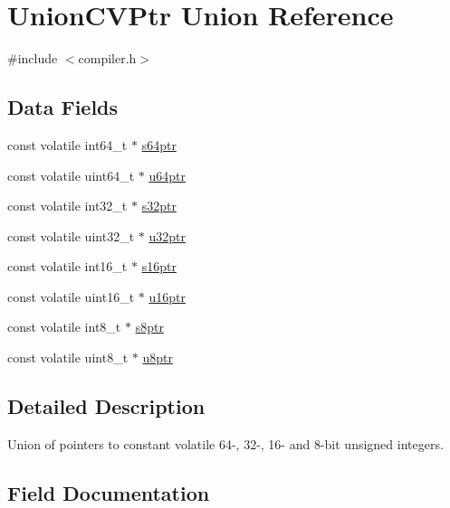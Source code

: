 \hypertarget{union_union_c_v_ptr}{}\section{Union\+C\+V\+Ptr Union Reference}
\label{union_union_c_v_ptr}


{\ttfamily \#include $<$compiler.\+h$>$}

\subsection*{Data Fields}
\begin{DoxyCompactItemize}
\item 
const volatile int64\+\_\+t $\ast$ \mbox{\hyperlink{union_union_c_v_ptr_aa79f3b96a6ad079e73cc0be13bd0e765}{s64ptr}}
\item 
const volatile uint64\+\_\+t $\ast$ \mbox{\hyperlink{union_union_c_v_ptr_a24a2bedaf12d427819c62babba34e2ef}{u64ptr}}
\item 
const volatile int32\+\_\+t $\ast$ \mbox{\hyperlink{union_union_c_v_ptr_a0aa7d6575057bad6b799c9b2909c077b}{s32ptr}}
\item 
const volatile uint32\+\_\+t $\ast$ \mbox{\hyperlink{union_union_c_v_ptr_a0e4e80d3c57067ad85c71af39d0ea817}{u32ptr}}
\item 
const volatile int16\+\_\+t $\ast$ \mbox{\hyperlink{union_union_c_v_ptr_a97b5d4643b545ecc9ac9c68fa35b74fe}{s16ptr}}
\item 
const volatile uint16\+\_\+t $\ast$ \mbox{\hyperlink{union_union_c_v_ptr_a288ff13c7abb2360d62009e2711e7485}{u16ptr}}
\item 
const volatile int8\+\_\+t $\ast$ \mbox{\hyperlink{union_union_c_v_ptr_afc839213e22402ccf98e7d143453b58d}{s8ptr}}
\item 
const volatile uint8\+\_\+t $\ast$ \mbox{\hyperlink{union_union_c_v_ptr_ae6228fb5d646745079910ea045f314e3}{u8ptr}}
\end{DoxyCompactItemize}


\subsection{Detailed Description}
Union of pointers to constant volatile 64-\/, 32-\/, 16-\/ and 8-\/bit unsigned integers. 

\subsection{Field Documentation}
\mbox{\label{union_union_c_v_ptr_a97b5d4643b545ecc9ac9c68fa35b74fe}} 
